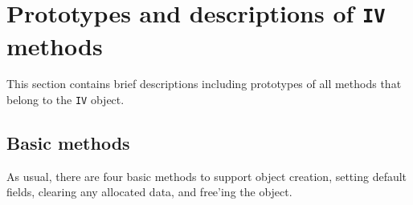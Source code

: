\par
\section{Prototypes and descriptions of {\tt IV} methods}
\label{section:IV:proto}
\par
This section contains brief descriptions including prototypes
of all methods that belong to the {\tt IV} object.
\par
\subsection{Basic methods}
\label{subsection:IV:proto:basics}
\par
As usual, there are four basic methods to support object creation,
setting default fields, clearing any allocated data, and free'ing
the object.
\par
